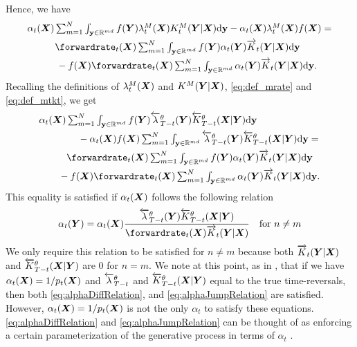Hence, we have 
\begin{align}
    &\textstyle \alpha_t(\mX)  \inty f(\mY) \mrate_t(\mX) \mtk_t(\mY | \mX) \rmd \y - \alpha_t(\mX) \mrate_t(\mX) f(\mX) = \\
    &\textstyle  \hspace{1cm} \forwardrate_t(\mX) \inty f(\mY) \alpha_t(\mY) \ftk_t(\mY | \mX) \rmd \y \\
  & \qquad \quad \textstyle - f(\mX) \forwardrate_t(\mX) \inty \alpha_t(\mY) \ftk_t(\mY | \mX) \rmd \y . 
\end{align}
Recalling the definitions of $\lambda^M_t({\bm{X}})$ and $K^{M}({\bm{Y}} | {\bm{X}})$, \eqref{eq:def_mrate} and \eqref{eq:def_mtkt}, we get 
\begin{align}
  &\textstyle \alpha_t(\mX) \inty f(\mY) \backwardrate_{T-t}^\theta(\mY) \btk_{T-t}^\theta(\mX | \mY) \rmd \y \\
  & \qquad \qquad \textstyle - \alpha_t(\mX) f(\mX) \inty \backwardrate_{T-t}^\theta(\mY) \btk_{T-t}^\theta(\mX | \mY) \rmd \y = \\
  &\textstyle  \hspace{1cm} \forwardrate_t(\mX) \inty f(\mY) \alpha_t(\mY) \ftk_t(\mY | \mX) \rmd \y \\
  & \qquad \textstyle - f(\mX) \forwardrate_t(\mX) \inty \alpha_t(\mY) \ftk_t(\mY | \mX) \rmd \y .
\end{align}
This equality is satisfied if $\alpha_t({\bm{X}})$ follows the following relation
\begin{equation}
    \alpha_t(\mY) = \alpha_t(\mX) \frac{\backwardrate_{T-t}^\theta(\mY) \btk_{T-t}^\theta(\mX | \mY)}{\forwardrate_t(\mX) \ftk_t(\mY | \mX)} \quad \text{for } n \neq m
    \label{eq:alphaJumpRelation}
\end{equation}
We only require this relation to be satisfied for $n \neq m$ because both $\overrightarrow{K}_t({\bm{Y}} | {\bm{X}})$ and $\overleftarrow{K}_{T-t}^\theta({\bm{X}} | {\bm{Y}})$ are $0$ for $n = m$.
We note at this point, as in \cite{benton2022denoising}, that if we have $\alpha_t({\bm{X}}) = 1/p_t({\bm{X}})$ and $\overleftarrow{\lambda}_{T-t}^\theta$ and $\overleftarrow{K}_{T-t}^\theta({\bm{X}} | {\bm{Y}})$ equal to the true time-reversals, then both \eqref{eq:alphaDiffRelation}, and \eqref{eq:alphaJumpRelation} are satisfied. However, $\alpha_t({\bm{X}}) = 1/p_t({\bm{X}})$ is not the only $\alpha_t$ to satisfy these equations. \eqref{eq:alphaDiffRelation} and \eqref{eq:alphaJumpRelation} can be thought of as enforcing a certain parameterization of the generative process in terms of $\alpha_t$ \cite{benton2022denoising}.


